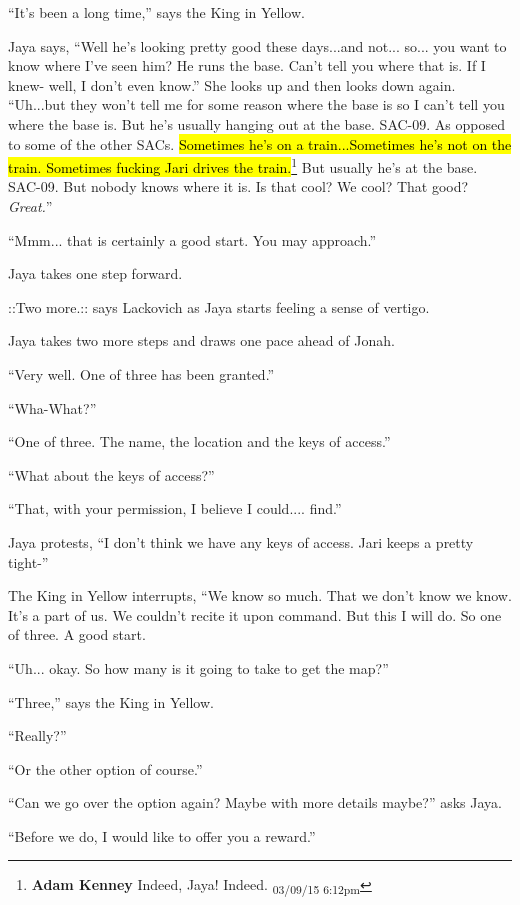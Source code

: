 ``It's been a long time,'' says the King in Yellow.

Jaya says, ``Well he's looking pretty good these days...and not... so... you want to know where I've seen him?  He runs the base.  Can't tell you where that is.  If I knew- well, I don't even know.''  She looks up and then looks down again.  ``Uh...but they won't tell me for some reason where the base is so I can't tell you where the base is. But he's usually hanging out at the base. SAC-09. As opposed to some of the other SACs.  \hl{Sometimes he's on a train...Sometimes he's not on the train. Sometimes fucking Jari drives the train.}\footnote{\textbf{Adam Kenney }Indeed, Jaya! Indeed. \textsubscript{03/09/15 6:12pm}}  But usually he's at the base. SAC-09.  But nobody knows where it is.  Is that cool?  We cool?  That good?  \textit{Great.}''

``Mmm... that is certainly a good start.  You may approach.''

Jaya takes one step forward.

 {\color[RGB]{74,134,232}::Two more.::}  says Lackovich as Jaya starts feeling a sense of vertigo.

Jaya takes two more steps and draws one pace ahead of Jonah.

``Very well.  One of three has been granted.''

``Wha-What?''

``One of three.  The name, the location and the keys of access.''

``What about the keys of access?''

``That, with your permission, I believe I could.... find.''

Jaya protests, ``I don't think we have any keys of access.  Jari keeps a pretty tight-''

The King in Yellow interrupts, ``We know so much.  That we don't know we know.  It's a part of us.  We couldn't recite it upon command.  But this I will do.  So one of three.  A good start.

``Uh... okay.  So how many is it going to take to get the map?''

``Three,'' says the King in Yellow.

``Really?''

``Or the other option of course.''

``Can we go over the option again?  Maybe with more details maybe?'' asks Jaya.

``Before we do, I would like to offer you a reward.''

